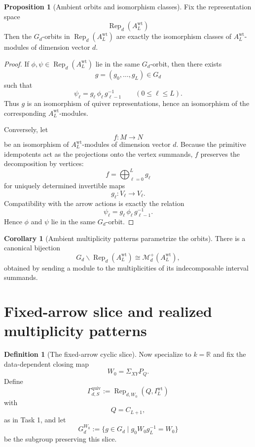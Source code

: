 \documentclass{article}
\newcommand{\R}{\mathbb{R}}
\newcommand{\Rep}{\operatorname{Rep}}
\theoremstyle{definition}
\newtheorem{proposition}[theorem]{Proposition}
\newtheorem{corollary}[theorem]{Corollary}
\newtheorem{definition}[theorem]{Definition}
\begin{document}
\begin{proposition}[Ambient orbits and isomorphism classes]
Fix the representation space
\[
\Rep_d(A_L^{\mathrm{wt}})
\]
Then the $G_d$-orbits in $\Rep_d(A_L^{\mathrm{wt}})$ are exactly the
isomorphism classes of $A_L^{\mathrm{wt}}$-modules of dimension vector $d$.
\end{proposition}

\begin{proof}
If $\phi,\psi\in \Rep_d(A_L^{\mathrm{wt}})$ lie in the same $G_d$-orbit, then
there exists
\[
g=(g_0,\dots,g_L)\in G_d
\]
such that
\[
\psi_\ell=g_\ell\,\phi_\ell\,g_{\ell-1}^{-1}
\qquad
(0\le \ell\le L).
\]
Thus $g$ is an isomorphism of quiver representations, hence an isomorphism of
the corresponding $A_L^{\mathrm{wt}}$-modules.

Conversely, let
\[
f:M\to N
\]
be an isomorphism of $A_L^{\mathrm{wt}}$-modules of dimension vector $d$.
Because the primitive idempotents act as the projections onto the vertex
summands, $f$ preserves the decomposition by vertices:
\[
f=\bigoplus_{\ell=0}^L g_\ell
\]
for uniquely determined invertible maps
\[
g_\ell:V_\ell\to V_\ell.
\]
Compatibility with the arrow actions is exactly the relation
\[
\psi_\ell=g_\ell\,\phi_\ell\,g_{\ell-1}^{-1}.
\]
Hence $\phi$ and $\psi$ lie in the same $G_d$-orbit.
\end{proof}

\begin{corollary}[Ambient multiplicity patterns parametrize the orbits]
There is a canonical bijection
\[
G_d\backslash \Rep_d(A_L^{\mathrm{wt}})
\cong
\mathcal M_d^+(A_L^{\mathrm{wt}}),
\]
obtained by sending a module to the multiplicities of its indecomposable
interval summands.
\end{corollary}

\section{Fixed-arrow slice and realized multiplicity patterns}

\begin{definition}[The fixed-arrow cyclic slice]
Now specialize to $k=\R$ and fix the data-dependent closing map
\[
W_0=\Sigma_{XY}P_Q.
\]
Define
\[
\Gamma_{d,S}^{\mathrm{quiv}}
:=
\Rep_{d,W_0}(Q,I_L^{\mathrm{wt}})
\]
with
\[
Q=C_{L+1},
\]
as in Task 1, and let
\[
G_d^{W_0}
:=
\{g\in G_d\mid g_0W_0g_L^{-1}=W_0\}
\]
be the subgroup preserving this slice.
\end{definition}
\end{document}
